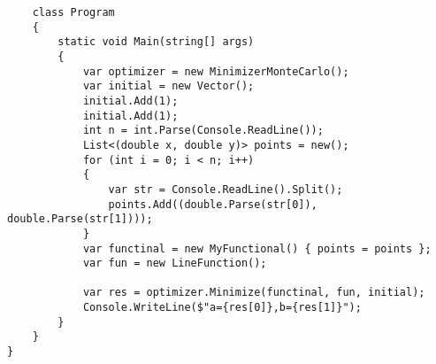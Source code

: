 \begin{verbatim}
	class Program
	{
		static void Main(string[] args)
		{
			var optimizer = new MinimizerMonteCarlo();
			var initial = new Vector();
			initial.Add(1);
			initial.Add(1);
			int n = int.Parse(Console.ReadLine());
			List<(double x, double y)> points = new();
			for (int i = 0; i < n; i++)
			{
				var str = Console.ReadLine().Split();
				points.Add((double.Parse(str[0]), double.Parse(str[1])));
			}
			var functinal = new MyFunctional() { points = points };
			var fun = new LineFunction();
			
			var res = optimizer.Minimize(functinal, fun, initial);
			Console.WriteLine($"a={res[0]},b={res[1]}");
		}
	}
}
\end{verbatim}